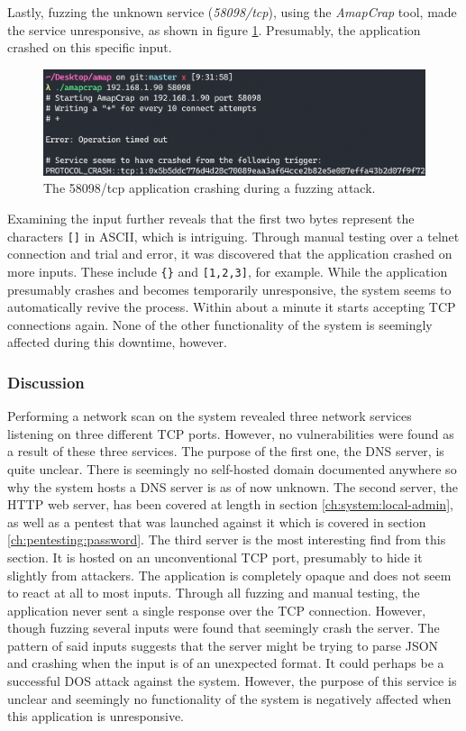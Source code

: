 Lastly, fuzzing the unknown service (\textit{58098/tcp}), using the \textit{AmapCrap} tool, made the service unresponsive, as shown in figure \ref{fig:amapcrap-fuzz-attack}. Presumably, the application crashed on this specific input.
\begin{figure}[!ht]
    \centering
    \includegraphics[width=\textwidth]{images/6-pentesting/amapcrap-fuzz-crash.png}
    \caption{The 58098/tcp application crashing during a fuzzing attack.}
    \label{fig:amapcrap-fuzz-attack}
\end{figure}

Examining the input further reveals that the first two bytes represent the characters \texttt{[]} in ASCII, which is intriguing. Through manual testing over a telnet connection and trial and error, it was discovered that the application crashed on more inputs. These include \texttt{\{\}} and \texttt{[1,2,3]}, for example. While the application presumably crashes and becomes temporarily unresponsive, the system seems to automatically revive the process. Within about a minute it starts accepting TCP connections again. None of the other functionality of the system is seemingly affected during this downtime, however.

\subsubsection{Discussion}
Performing a network scan on the system revealed three network services listening on three different TCP ports. However, no vulnerabilities were found as a result of these three services. The purpose of the first one, the DNS server, is quite unclear. There is seemingly no self-hosted domain documented anywhere so why the system hosts a DNS server is as of now unknown. The second server, the HTTP web server, has been covered at length in section \ref{ch:system:local-admin}, as well as a pentest that was launched against it which is covered in section \ref{ch:pentesting:password}. The third server is the most interesting find from this section. It is hosted on an unconventional TCP port, presumably to hide it slightly from attackers. The application is completely opaque and does not seem to react at all to most inputs. Through all fuzzing and manual testing, the application never sent a single response over the TCP connection. However, though fuzzing several inputs were found that seemingly crash the server. The pattern of said inputs suggests that the server might be trying to parse JSON and crashing when the input is of an unexpected format. It could perhaps be a successful \gls{DOS} attack against the system. However, the purpose of this service is unclear and seemingly no functionality of the system is negatively affected when this application is unresponsive.

